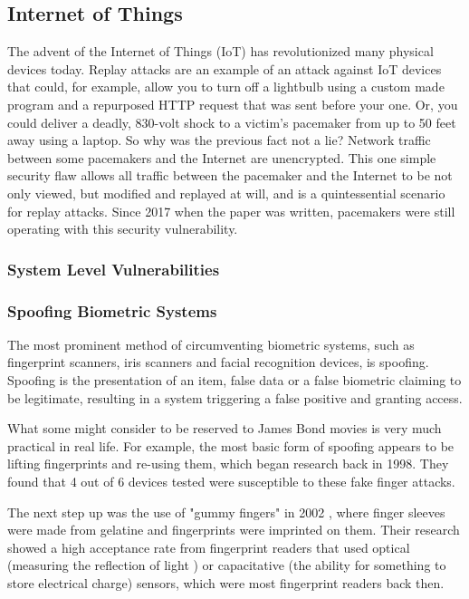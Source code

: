 \documentclass[a4paper, 11pt]{article}
\begin{document}
\subsection{Internet of Things}
\label{sec:iot}
The advent of the Internet of Things (IoT) has revolutionized many physical devices today. Replay attacks are an example of an attack against IoT devices that could, for example, allow you to turn off a lightbulb using a custom made program and a repurposed HTTP request that was sent before your one. Or, you could deliver a deadly, 830-volt shock to a victim's pacemaker from up to 50 feet away using a laptop. \cite{ref:pacemakers} So why was the previous fact not a lie? Network traffic between some pacemakers and the Internet are unencrypted. This one simple security flaw allows all traffic between the pacemaker and the Internet to be not only viewed, but modified and replayed at will, and is a quintessential scenario for replay attacks. Since 2017 when the paper was written, pacemakers were still operating with this security vulnerability.

\subsubsection{System Level Vulnerabilities}
\label{sec:systemlevel}

\subsubsection{Spoofing Biometric Systems}
\label{sec:spoofingbiometric}
The most prominent method of circumventing biometric systems, such as fingerprint scanners, iris scanners and facial recognition devices, is spoofing. \cite{ref:biometricattackvectors} Spoofing is the presentation of an item, false data or a false biometric claiming to be legitimate, resulting in a system triggering a false positive and granting access. \cite{ref:biometricattackvectors}

What some might consider to be reserved to James Bond movies is very much practical in real life. For example, the most basic form of spoofing appears to be lifting fingerprints and re-using them, which began research back in 1998. \cite{ref:biometricattackvectors,ref:willis1998six} They found that 4 out of 6 devices tested were susceptible to these fake finger attacks. \cite{ref:willis1998six}

The next step up was the use of "gummy fingers" in 2002 \cite{ref:matsumoto2002impact}, where finger sleeves were made from gelatine and fingerprints were imprinted on them. Their research showed a high acceptance rate from fingerprint readers that used optical (measuring the reflection of light \cite{ref:matsumoto2002impact}) or capacitative (the ability for something to store electrical charge) sensors, which were most fingerprint readers back then. \cite{ref:matsumoto2002impact}
\end{document}
